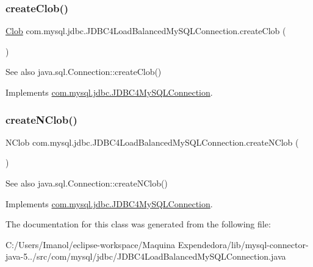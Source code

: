 \subsubsection{\texorpdfstring{create\+Clob()}{createClob()}}
{\footnotesize\ttfamily \mbox{\hyperlink{classcom_1_1mysql_1_1jdbc_1_1_clob}{Clob}} com.\+mysql.\+jdbc.\+J\+D\+B\+C4\+Load\+Balanced\+My\+S\+Q\+L\+Connection.\+create\+Clob (\begin{DoxyParamCaption}{ }\end{DoxyParamCaption})}

\begin{DoxySeeAlso}{See also}
java.\+sql.\+Connection\+::create\+Clob() 
\end{DoxySeeAlso}


Implements \mbox{\hyperlink{interfacecom_1_1mysql_1_1jdbc_1_1_j_d_b_c4_my_s_q_l_connection}{com.\+mysql.\+jdbc.\+J\+D\+B\+C4\+My\+S\+Q\+L\+Connection}}.

\mbox{\label{classcom_1_1mysql_1_1jdbc_1_1_j_d_b_c4_load_balanced_my_s_q_l_connection_aa2fc0ccba4c551009e1cf5b38e06e7bd}} 
\subsubsection{\texorpdfstring{create\+N\+Clob()}{createNClob()}}
{\footnotesize\ttfamily N\+Clob com.\+mysql.\+jdbc.\+J\+D\+B\+C4\+Load\+Balanced\+My\+S\+Q\+L\+Connection.\+create\+N\+Clob (\begin{DoxyParamCaption}{ }\end{DoxyParamCaption})}

\begin{DoxySeeAlso}{See also}
java.\+sql.\+Connection\+::create\+N\+Clob() 
\end{DoxySeeAlso}


Implements \mbox{\hyperlink{interfacecom_1_1mysql_1_1jdbc_1_1_j_d_b_c4_my_s_q_l_connection}{com.\+mysql.\+jdbc.\+J\+D\+B\+C4\+My\+S\+Q\+L\+Connection}}.



The documentation for this class was generated from the following file\+:\begin{DoxyCompactItemize}
\item 
C\+:/\+Users/\+Imanol/eclipse-\/workspace/\+Maquina Expendedora/lib/mysql-\/connector-\/java-\/5../src/com/mysql/jdbc/J\+D\+B\+C4\+Load\+Balanced\+My\+S\+Q\+L\+Connection.\+java\end{DoxyCompactItemize}
